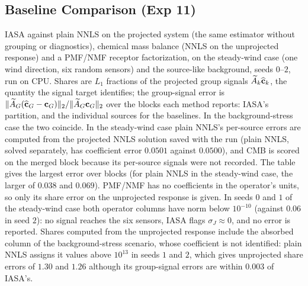 \subsection{Baseline Comparison (Exp 11)}
IASA against plain NNLS on the projected system (the same estimator without grouping
or diagnostics), chemical mass balance (NNLS on the unprojected response) and a
PMF/NMF receptor factorization, on the steady-wind case (one wind direction, six random sensors) and the source-like
background, seeds \(0\)--\(2\), run on CPU.  Shares are \(L_1\) fractions of the
projected group signals \(\widetilde A_k\widehat{\mathbf c}_k\), the quantity the signal target
identifies; the group-signal error is
\(\|\widetilde A_G(\widehat{\mathbf c}_G-\mathbf c_G)\|_2/\|\widetilde A_G\mathbf c_G\|_2\) over the blocks
each method reports: IASA's partition, and the individual sources for the baselines.
In the background-stress case the two coincide.  In the steady-wind case plain NNLS's
per-source errors are computed from the projected NNLS solution saved with the run
(plain NNLS, solved separately, has coefficient error \(0.0501\) against \(0.0500\)), and
CMB is scored on the merged block because its per-source signals were not recorded.
The table gives the largest error over blocks (for plain NNLS in the steady-wind case,
the larger of \(0.038\) and \(0.069\)).  PMF/NMF has
no coefficients in the operator's units, so only its share error on the unprojected
response is given.  In seeds \(0\) and \(1\) of the steady-wind case both operator columns have
norm below \(10^{-10}\) (against \(0.06\) in seed \(2\)): no signal reaches the six
sensors, IASA flags \(\sigma_J\approx0\), and no error is reported.  Shares computed
from the unprojected response include the absorbed column of the background-stress
scenario, whose coefficient is not identified: plain NNLS assigns it values above
\(10^{13}\) in seeds \(1\) and \(2\), which gives unprojected share errors of \(1.30\) and
\(1.26\) although its group-signal errors are within \(0.003\) of IASA's.
